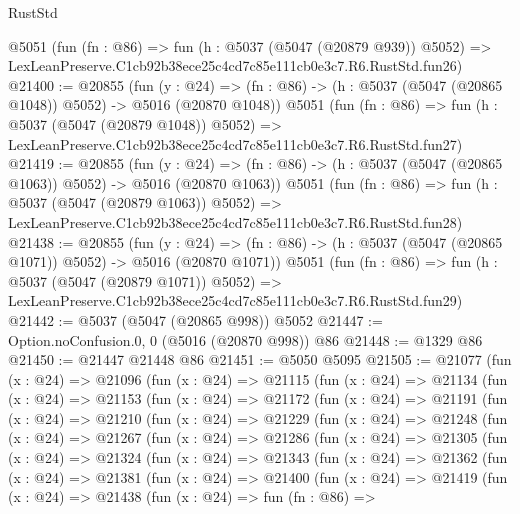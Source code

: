 \begin{lexlean}{RustStd}
\begin{coremodule}
    @5051
    (fun (fn : @86) =>
    fun (h : @5037 (@5047 (@20879 @939)) @5052) =>
    LexLeanPreserve.C1cb92b38ece25c4cd7c85e111cb0e3c7.R6.RustStd.fun26)
@21400 := @20855
    (fun (y : @24) =>
    (fn : @86) -> (h : @5037 (@5047 (@20865 @1048)) @5052) -> @5016 (@20870 @1048))
    @5051
    (fun (fn : @86) =>
    fun (h : @5037 (@5047 (@20879 @1048)) @5052) =>
    LexLeanPreserve.C1cb92b38ece25c4cd7c85e111cb0e3c7.R6.RustStd.fun27)
@21419 := @20855
    (fun (y : @24) =>
    (fn : @86) -> (h : @5037 (@5047 (@20865 @1063)) @5052) -> @5016 (@20870 @1063))
    @5051
    (fun (fn : @86) =>
    fun (h : @5037 (@5047 (@20879 @1063)) @5052) =>
    LexLeanPreserve.C1cb92b38ece25c4cd7c85e111cb0e3c7.R6.RustStd.fun28)
@21438 := @20855
    (fun (y : @24) =>
    (fn : @86) -> (h : @5037 (@5047 (@20865 @1071)) @5052) -> @5016 (@20870 @1071))
    @5051
    (fun (fn : @86) =>
    fun (h : @5037 (@5047 (@20879 @1071)) @5052) =>
    LexLeanPreserve.C1cb92b38ece25c4cd7c85e111cb0e3c7.R6.RustStd.fun29)
@21442 := @5037 (@5047 (@20865 @998)) @5052
@21447 := Option.noConfusion.{0, 0} (@5016 (@20870 @998)) @86
@21448 := @1329 @86
@21450 := @21447 @21448 @86
@21451 := @5050 @5095
@21505 := @21077
    (fun (x : @24) =>
    @21096
      (fun (x : @24) =>
      @21115
        (fun (x : @24) =>
        @21134
          (fun (x : @24) =>
          @21153
            (fun (x : @24) =>
            @21172
              (fun (x : @24) =>
              @21191
                (fun (x : @24) =>
                @21210
                  (fun (x : @24) =>
                  @21229
                    (fun (x : @24) =>
                    @21248
                      (fun (x : @24) =>
                      @21267
                        (fun (x : @24) =>
                        @21286
                          (fun (x : @24) =>
                          @21305
                            (fun (x : @24) =>
                            @21324
                              (fun (x : @24) =>
                              @21343
                                (fun (x : @24) =>
                                @21362
                                  (fun (x : @24) =>
                                  @21381
                                    (fun (x : @24) =>
                                    @21400
                                      (fun (x : @24) =>
                                      @21419
                                        (fun (x : @24) =>
                                        @21438
                                          (fun (x : @24) =>
                                          fun (fn : @86) =>

\end{coremodule}
\end{lexlean}
